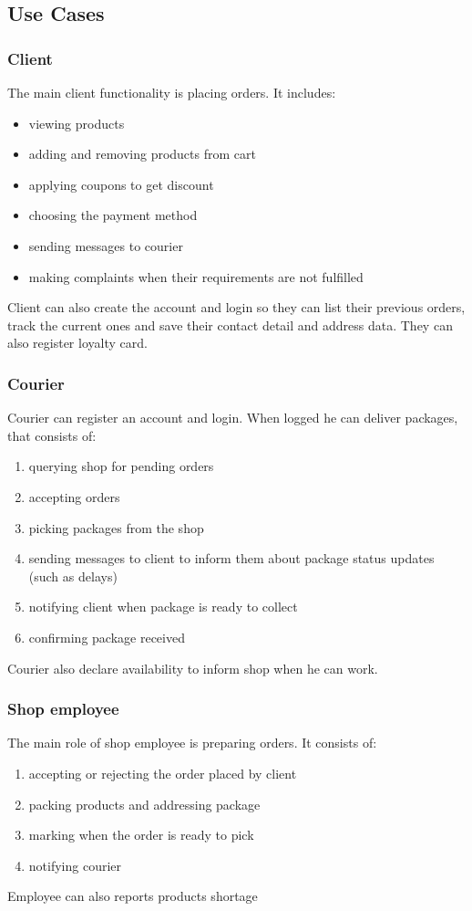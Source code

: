 \documentclass[../main.tex]{subfiles}
\begin{document}
\newpage
\subsection{Use Cases}

\subsubsection{Client}
The main client functionality is placing orders. It includes:
\begin{itemize}
    \item viewing products
    \item adding and removing products from cart
    \item applying coupons to get discount
    \item choosing the payment method
    \item sending messages to courier
    \item making complaints when their requirements are not fulfilled
\end{itemize}
Client can also create the account and login so they can list their previous orders, track the current ones and save their contact detail and address data. They can also register loyalty card.

\subsubsection{Courier}
Courier can register an account and login. When logged he can deliver packages, that consists of:
\begin{enumerate}
    \item querying shop for pending orders
    \item accepting orders
    \item picking packages from the shop
    \item sending messages to client to inform them about package status updates (such as delays)
    \item notifying client when package is ready to collect
    \item confirming package received
\end{enumerate}
Courier also declare availability to inform shop when he can work.

\subsubsection{Shop employee}
The main role of shop employee is preparing orders. It consists of:
\begin{enumerate}
    \item accepting or rejecting the order placed by client
    \item packing products and addressing package
    \item marking when the order is ready to pick
    \item notifying courier
\end{enumerate}
Employee can also reports products shortage
\end{document}
